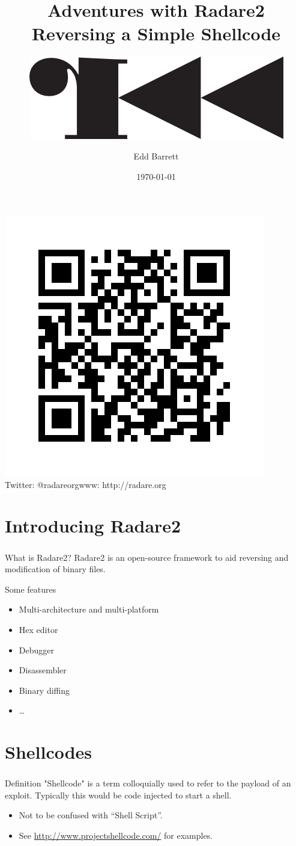 \documentclass{beamer}
\title{Adventures with Radare2\\Reversing a Simple Shellcode}
\subtitle{\includegraphics[width=.25\textwidth]{r2.png}}
\author{Edd Barrett}
\date{\today}
\begin{document}
\begin{frame}
  \titlepage
  \vspace{-5em}
  \begin{center}
  \includegraphics[width=.25\textwidth]{qr.png}\\
  Twitter: @radareorg\hfill www: http://radare.org
  \end{center}
\end{frame}

\section{Introducing Radare2}

\begin{frame}[fragile]
\frametitle{\insertsection}

\begin{block}{What is Radare2?}
Radare2 is an open-source framework to aid reversing and modification of binary files.
\end{block}

\vfill

\begin{block}{Some features}
\begin{itemize}
\item Multi-architecture and multi-platform
\item Hex editor
\item Debugger
\item Disassembler
\item Binary diffing
\item \ldots
\end{itemize}
\end{block}

\end{frame}

\section{Shellcodes}
\begin{frame}
  \frametitle{\insertsection}

  \begin{block}{Definition}
  "Shellcode" is a term colloquially used to refer to the payload of an
  exploit. Typically this would be code injected to start a shell.    
  \end{block}

  \vfill

  \begin{itemize}
    \item Not to be confused with ``Shell Script''.
    \vfill
    \item See \url{http://www.projectshellcode.com/} for examples.
  \end{itemize}
\end{frame}
\end{document}
